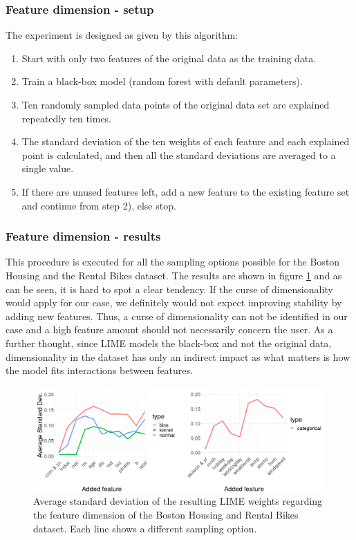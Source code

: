\documentclass[]{krantz}
\begin{document}
\subsubsection{Feature dimension -
setup}\label{feature-dimension---setup}

The experiment is designed as given by this algorithm:

\begin{enumerate}
\def\labelenumi{\arabic{enumi})}
\item
  Start with only two features of the original data as the training
  data.
\item
  Train a black-box model (random forest with default parameters).
\item
  Ten randomly sampled data points of the original data set are
  explained repeatedly ten times.
\item
  The standard deviation of the ten weights of each feature and each
  explained point is calculated, and then all the standard deviations
  are averaged to a single value.
\item
  If there are unused features left, add a new feature to the existing
  feature set and continue from step 2), else stop.
\end{enumerate}

\subsubsection{Feature dimension -
results}\label{feature-dimension---results}

This procedure is executed for all the sampling options possible for the
Boston Housing and the Rental Bikes dataset. The results are shown in
figure \ref{fig:figsdp} and as can be seen, it is hard to spot a clear
tendency. If the curse of dimensionality would apply for our case, we
definitely would not expect improving stability by adding new features.
Thus, a curse of dimensionality can not be identified in our case and a
high feature amount should not necessarily concern the user. As a
further thought, since LIME models the black-box and not the original
data, dimensionality in the dataset has only an indirect impact as what
matters is how the model fits interactions between features.

\begin{figure}

{\centering \includegraphics[width=0.99\linewidth]{images/sd_p_presi3} 

}

\caption{Average standard deviation of the resulting LIME weights regarding the feature dimension of the Boston Housing and Rental Bikes dataset. Each line shows a different sampling option.}\label{fig:figsdp}
\end{figure}
\end{document}
